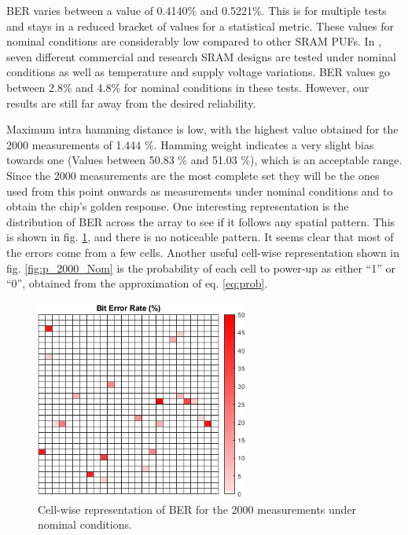 BER varies between a value of 0.4140\% and 0.5221\%. This is for multiple tests and stays in a reduced bracket of values for a statistical metric. These values for nominal conditions are considerably low compared to other SRAM PUFs. In \cite{Schrijen2012}, seven different commercial and research SRAM designs are tested under nominal conditions as well as temperature and supply voltage variations.  BER values go between 2.8\% and 4.8\% for nominal conditions in these tests. However, our results are still far away from the desired reliability.

Maximum intra hamming distance is low, with the highest value obtained for the 2000 measurements of 1.444 \%. Hamming weight indicates a very slight bias towards one (Values between 50.83 \% and 51.03 \%), which is an acceptable range. Since the 2000 measurements are the most complete set they will be the ones used from this point onwards as measurements under nominal conditions and to obtain the chip's golden response. One interesting representation is the distribution of BER across the array to see if it follows any spatial pattern. This is shown in fig. \ref{fig:BER_2000_Nom}, and there is no noticeable pattern. It seems clear that most of the errors come from a few cells. Another useful cell-wise representation shown in fig. \ref{fig:p_2000_Nom} is the probability of each cell to power-up as either ``1'' or ``0'', obtained from the approximation of eq. \ref{eq:prob}.


 \begin{figure}[H]
    \centering
    \includegraphics[width=7cm]{images/BER_2000_Nom.png}
    \caption{Cell-wise  representation of BER for the 2000 measurements under nominal conditions. }
    \label{fig:BER_2000_Nom}
 \end{figure}




